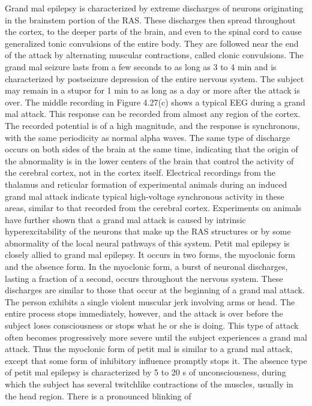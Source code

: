 Grand mal epilepsy is characterized by extreme discharges of neurons
originating in the brainstem portion of the RAS. These discharges then spread
throughout the cortex, to the deeper parts of the brain, and even to the spinal
cord to cause generalized tonic convulsions of the entire body. They are
followed near the end of the attack by alternating muscular contractions, called
clonic convulsions. The grand mal seizure lasts from a few seconds to as long as
3 to 4 min and is characterized by postseizure depression of the entire nervous
system. The subject may remain in a stupor for 1 min to as long as a day or more
after the attack is over.
The middle recording in Figure 4.27(c) shows a typical EEG during a
grand mal attack. This response can be recorded from almost any region of the
cortex. The recorded potential is of a high magnitude, and the response is
synchronous, with the same periodicity as normal alpha waves. The same type
of discharge occurs on both sides of the brain at the same time, indicating that
the origin of the abnormality is in the lower centers of the brain that control the
activity of the cerebral cortex, not in the cortex itself. Electrical recordings
from the thalamus and reticular formation of experimental animals during an
induced grand mal attack indicate typical high-voltage synchronous activity in
these areas, similar to that recorded from the cerebral cortex. Experiments on
animals have further shown that a grand mal attack is caused by intrinsic
hyperexcitability of the neurons that make up the RAS structures or by some
abnormality of the local neural pathways of this system.
Petit mal epilepsy is closely allied to grand mal epilepsy. It occurs in two
forms, the myoclonic form and the absence form. In the myoclonic form, a
burst of neuronal discharges, lasting a fraction of a second, occurs throughout
the nervous system. These discharges are similar to those that occur at the
beginning of a grand mal attack. The person exhibits a single violent muscular
jerk involving arms or head. The entire process stops immediately, however,
and the attack is over before the subject loses consciousness or stops what he or
she is doing. This type of attack often becomes progressively more severe until
the subject experiences a grand mal attack. Thus the myoclonic form of petit
mal is similar to a grand mal attack, except that some form of inhibitory
influence promptly stops it.
The absence type of petit mal epilepsy is characterized by 5 to 20 s of
unconsciousness, during which the subject has several twitchlike contractions
of the muscles, usually in the head region. There is a pronounced blinking of
